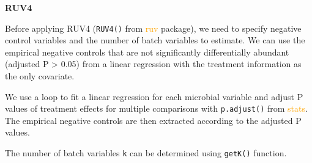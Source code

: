 \documentclass[
]{book}
\newenvironment{Shaded}{\begin{snugshade}}{\end{snugshade}}
\newcommand{\AttributeTok}[1]{\textcolor[rgb]{0.77,0.63,0.00}{#1}}
\newcommand{\CommentTok}[1]{\textcolor[rgb]{0.56,0.35,0.01}{\textit{#1}}}
\newcommand{\ControlFlowTok}[1]{\textcolor[rgb]{0.13,0.29,0.53}{\textbf{#1}}}
\newcommand{\DecValTok}[1]{\textcolor[rgb]{0.00,0.00,0.81}{#1}}
\newcommand{\FloatTok}[1]{\textcolor[rgb]{0.00,0.00,0.81}{#1}}
\newcommand{\FunctionTok}[1]{\textcolor[rgb]{0.00,0.00,0.00}{#1}}
\newcommand{\NormalTok}[1]{#1}
\newcommand{\OtherTok}[1]{\textcolor[rgb]{0.56,0.35,0.01}{#1}}
\newcommand{\SpecialCharTok}[1]{\textcolor[rgb]{0.00,0.00,0.00}{#1}}
\newcommand{\StringTok}[1]{\textcolor[rgb]{0.31,0.60,0.02}{#1}}
\begin{document}
\textbf{RUV4}

Before applying RUV4 (\texttt{RUV4()} from \textcolor{orange}{ruv} package), we need to specify negative control variables and the number of batch variables to estimate. We can use the empirical negative controls that are not significantly differentially abundant (adjusted P \textgreater{} 0.05) from a linear regression with the treatment information as the only covariate.

We use a loop to fit a linear regression for each microbial variable and adjust P values of treatment effects for multiple comparisons with \texttt{p.adjust()} from \textcolor{orange}{stats}. The empirical negative controls are then extracted according to the adjusted P values.

\begin{Shaded}
\end{Shaded}

The number of batch variables \texttt{k} can be determined using \texttt{getK()} function.

\begin{Shaded}
\end{Shaded}
\end{document}
